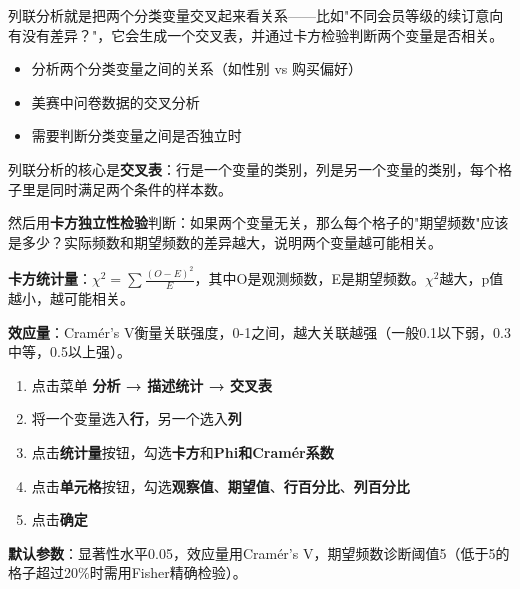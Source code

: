
\begin{algointro}
列联分析就是把两个分类变量交叉起来看关系——比如"不同会员等级的续订意向有没有差异？"，它会生成一个交叉表，并通过卡方检验判断两个变量是否相关。
\end{algointro}

\begin{algoscene}
\begin{itemize}
    \item 分析两个分类变量之间的关系（如性别 vs 购买偏好）
    \item 美赛中问卷数据的交叉分析
    \item 需要判断分类变量之间是否独立时
\end{itemize}
\end{algoscene}

\begin{algoprinciple}
列联分析的核心是\textbf{交叉表}：行是一个变量的类别，列是另一个变量的类别，每个格子里是同时满足两个条件的样本数。

然后用\textbf{卡方独立性检验}判断：如果两个变量无关，那么每个格子的"期望频数"应该是多少？实际频数和期望频数的差异越大，说明两个变量越可能相关。

\textbf{卡方统计量}：$\chi^2 = \sum\frac{(O-E)^2}{E}$，其中O是观测频数，E是期望频数。$\chi^2$越大，p值越小，越可能相关。

\textbf{效应量}：Cramér's V衡量关联强度，0-1之间，越大关联越强（一般0.1以下弱，0.3中等，0.5以上强）。
\end{algoprinciple}

\begin{algosposs}
\begin{enumerate}
    \item 点击菜单 \textbf{分析 → 描述统计 → 交叉表}
    \item 将一个变量选入\textbf{行}，另一个选入\textbf{列}
    \item 点击\textbf{统计量}按钮，勾选\textbf{卡方}和\textbf{Phi和Cramér系数}
    \item 点击\textbf{单元格}按钮，勾选\textbf{观察值}、\textbf{期望值}、\textbf{行百分比}、\textbf{列百分比}
    \item 点击\textbf{确定}
\end{enumerate}

\textbf{默认参数}：显著性水平0.05，效应量用Cramér's V，期望频数诊断阈值5（低于5的格子超过20\%时需用Fisher精确检验）。
\end{algosposs}


